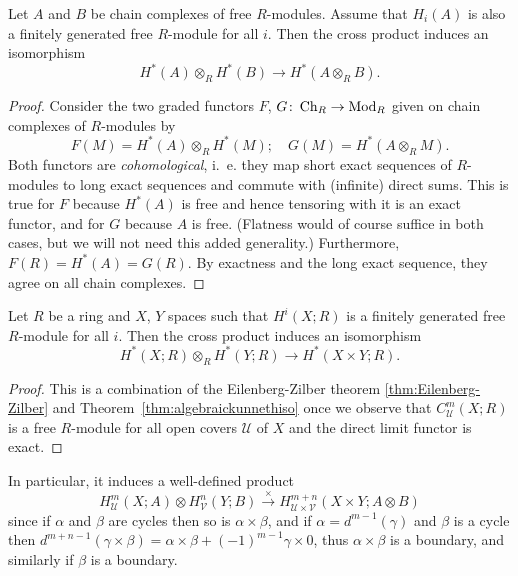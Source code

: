 \documentclass[a4paper,openany]{scrbook}
\begin{document}
\begin{thm}\label{thm:algebraickunnethiso}
Let $A$ and $B$ be chain complexes of free $R$-modules. Assume that $H_i(A)$ is also a finitely generated free $R$-module for all $i$. Then the cross product induces an isomorphism
\[
H^*(A) \otimes_R H^*(B) \to H^*(A \otimes_R B).
\]
\end{thm}
\begin{proof}
Consider the two graded functors $F$, $G\colon \operatorname{Ch}_R \to \operatorname{Mod}_R$ given on chain complexes of $R$-modules by
\[
F(M) = H^*(A) \otimes_R H^*(M); \quad G(M) = H^*(A \otimes_R M).
\]
Both functors are \emph{cohomological}, i.~e. they map short exact sequences of $R$-modules to long exact sequences and commute with (infinite) direct sums. This is true for $F$ because $H^*(A)$ is free and hence tensoring with it is an exact functor, and for $G$ because $A$ is free. (Flatness would of course suffice in both cases, but we will not need this added generality.) Furthermore, $F(R) = H^*(A) = G(R)$. By exactness and the long exact sequence, they agree on all chain complexes.
\end{proof}

\begin{corollary}\label{cor:kunneth}
Let $R$ be a ring and $X$, $Y$ spaces such that $H^i(X;R)$ is a finitely generated free $R$-module for all $i$. Then the cross product induces an isomorphism
\[
H^*(X;R) \otimes_R H^*(Y;R) \to H^*(X \times Y;R).
\]
\end{corollary}
\begin{proof}
This is a combination of the Eilenberg-Zilber theorem \eqref{thm:Eilenberg-Zilber} and Theorem~\ref{thm:algebraickunnethiso} once we observe that $C^m_{\mathcal U}(X;R)$ is a free $R$-module for all open covers $\mathcal U$ of $X$ and the direct limit functor is exact.
\end{proof}

In particular, it induces a well-defined product
\[
H^m_{\mathcal U}(X;A) \otimes H^n_{\mathcal V}(Y;B) \xrightarrow{\times} H^{m+n}_{\mathcal U \times \mathcal V}(X\times Y;A \otimes B)
\]
since if $\alpha$ and $\beta$ are cycles then so is $\alpha \times \beta$, and if $\alpha=d^{m-1}(\gamma)$ and $\beta$ is a cycle then $d^{m+n-1}(\gamma \times \beta) = \alpha \times \beta + (-1)^{m-1}\gamma \times 0$, thus $\alpha \times \beta$ is a boundary, and similarly if $\beta$ is a boundary.
\end{document}
